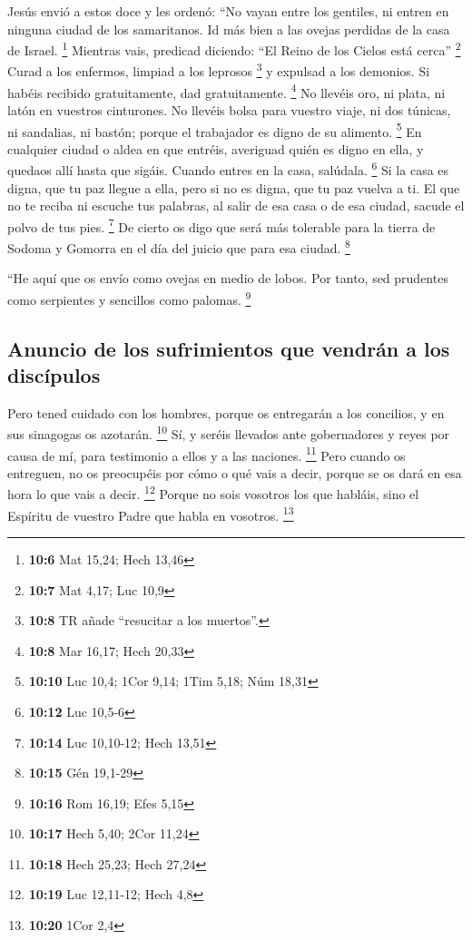 \begin{paracol}{2}
 Jesús envió a estos doce y les ordenó: ``No vayan entre
los gentiles, ni entren en ninguna ciudad de los samaritanos.
 Id más bien a las ovejas perdidas de la casa de Israel.
\footnote{\textbf{10:6} Mat 15,24; Hech 13,46}  Mientras
vais, predicad diciendo: ``El Reino de los Cielos está cerca''
\footnote{\textbf{10:7} Mat 4,17; Luc 10,9}  Curad a los
enfermos, limpiad a los leprosos \footnote{\textbf{10:8} TR añade
  ``resucitar a los muertos''.} y expulsad a los demonios. Si habéis
recibido gratuitamente, dad gratuitamente. \footnote{\textbf{10:8} Mar
  16,17; Hech 20,33}  No llevéis oro, ni plata, ni latón
en vuestros cinturones.  No llevéis bolsa para vuestro
viaje, ni dos túnicas, ni sandalias, ni bastón; porque el trabajador es
digno de su alimento. \footnote{\textbf{10:10} Luc 10,4; 1Cor 9,14; 1Tim
  5,18; Núm 18,31}  En cualquier ciudad o aldea en que
entréis, averiguad quién es digno en ella, y quedaos allí hasta que
sigáis.  Cuando entres en la casa, salúdala. \footnote{\textbf{10:12}
  Luc 10,5-6}  Si la casa es digna, que tu paz llegue a
ella, pero si no es digna, que tu paz vuelva a ti.  El
que no te reciba ni escuche tus palabras, al salir de esa casa o de esa
ciudad, sacude el polvo de tus pies. \footnote{\textbf{10:14} Luc
  10,10-12; Hech 13,51}  De cierto os digo que será más
tolerable para la tierra de Sodoma y Gomorra en el día del juicio que
para esa ciudad. \footnote{\textbf{10:15} Gén 19,1-29}

 ``He aquí que os envío como ovejas en medio de lobos.
Por tanto, sed prudentes como serpientes y sencillos como palomas.
\footnote{\textbf{10:16} Rom 16,19; Efes 5,15}

\hypertarget{anuncio-de-los-sufrimientos-que-vendruxe1n-a-los-discuxedpulos}{%
\subsection{Anuncio de los sufrimientos que vendrán a los
discípulos}\label{anuncio-de-los-sufrimientos-que-vendruxe1n-a-los-discuxedpulos}}

 Pero tened cuidado con los hombres, porque os entregarán
a los concilios, y en sus sinagogas os azotarán. \footnote{\textbf{10:17}
  Hech 5,40; 2Cor 11,24}  Sí, y seréis llevados ante
gobernadores y reyes por causa de mí, para testimonio a ellos y a las
naciones. \footnote{\textbf{10:18} Hech 25,23; Hech 27,24}
 Pero cuando os entreguen, no os preocupéis por cómo o
qué vais a decir, porque se os dará en esa hora lo que vais a decir.
\footnote{\textbf{10:19} Luc 12,11-12; Hech 4,8}  Porque
no sois vosotros los que habláis, sino el Espíritu de vuestro Padre que
habla en vosotros. \footnote{\textbf{10:20} 1Cor 2,4}


\end{paracol}
